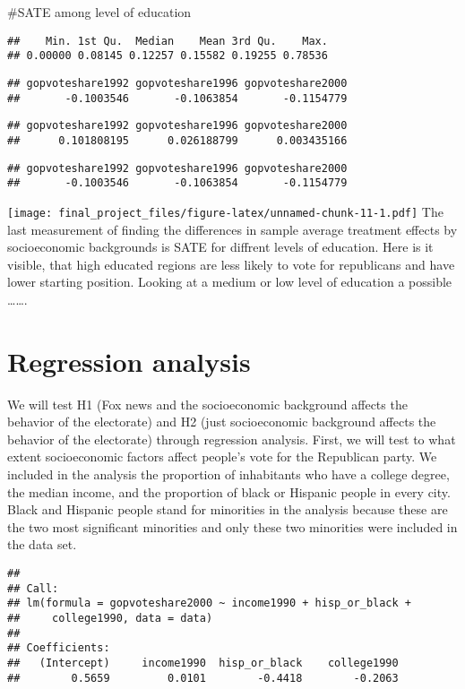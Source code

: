 \documentclass[
]{article}
\begin{document}
\#SATE among level of education

\begin{verbatim}
##    Min. 1st Qu.  Median    Mean 3rd Qu.    Max. 
## 0.00000 0.08145 0.12257 0.15582 0.19255 0.78536
\end{verbatim}

\begin{verbatim}
## gopvoteshare1992 gopvoteshare1996 gopvoteshare2000 
##       -0.1003546       -0.1063854       -0.1154779
\end{verbatim}

\begin{verbatim}
## gopvoteshare1992 gopvoteshare1996 gopvoteshare2000 
##      0.101808195      0.026188799      0.003435166
\end{verbatim}

\begin{verbatim}
## gopvoteshare1992 gopvoteshare1996 gopvoteshare2000 
##       -0.1003546       -0.1063854       -0.1154779
\end{verbatim}

\texttt{[image: final\_project\_files/figure-latex/unnamed-chunk-11-1.pdf]}
The last measurement of finding the differences in sample average treatment effects by socioeconomic backgrounds is SATE for diffrent levels of education. Here is it visible, that high educated regions are less likely to vote for republicans and have lower starting position. Looking at a medium or low level of education a possible \ldots\ldots.

\hypertarget{regression-analysis}{%
\section{Regression analysis}\label{regression-analysis}}

We will test H1 (Fox news and the socioeconomic background affects the behavior of the electorate) and H2 (just socioeconomic background affects the behavior of the electorate) through regression analysis. First, we will test to what extent socioeconomic factors affect people's vote for the Republican party. We included in the analysis the proportion of inhabitants who have a college degree, the median income, and the proportion of black or Hispanic people in every city. Black and Hispanic people stand for minorities in the analysis because these are the two most significant minorities and only these two minorities were included in the data set.

\begin{verbatim}
## 
## Call:
## lm(formula = gopvoteshare2000 ~ income1990 + hisp_or_black + 
##     college1990, data = data)
## 
## Coefficients:
##   (Intercept)     income1990  hisp_or_black    college1990  
##        0.5659         0.0101        -0.4418        -0.2063
\end{verbatim}
\end{document}
